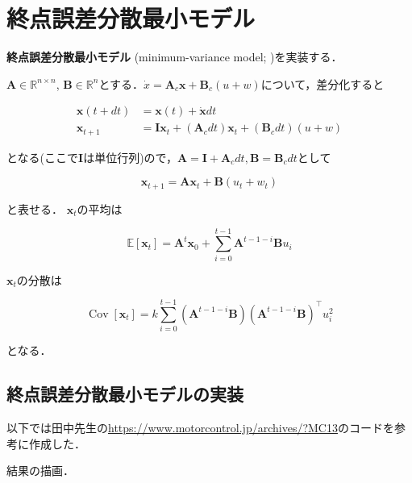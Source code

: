 \section{終点誤差分散最小モデル}
\textbf{終点誤差分散最小モデル} (minimum-variance model; \cite{Harris1998-gj})を実装する．

$\mathbf{A}\in \mathbb{R}^{n\times n}$, $\mathbf{B}\in \mathbb{R}^{n}$とする．$\dot{x}=\mathbf{A}_{c}\mathbf{x}+\mathbf{B}_{c}(u + w)$について，差分化すると


\begin{align}
\mathbf{x}(t+dt)&=\mathbf{x}(t)+\dot{\mathbf{x}}dt\\
\mathbf{x}_{t+1}&=\mathbf{I}\mathbf{x}_t+(\mathbf{A}_{c}dt)\mathbf{x}_t+(\mathbf{B}_{c}dt)(u + w)
\end{align}


となる(ここで$\mathbf{I}$は単位行列)ので，$\mathbf{A}=\mathbf{I}+\mathbf{A}_{c}dt, \mathbf{B}=\mathbf{B}_cdt$として


\begin{equation}
\mathbf{x}_{t+1} = \mathbf{A} \mathbf{x}_t + \mathbf{B}(u_t + w_t)
\end{equation}


と表せる． $\mathbf{x}_t$の平均は


\begin{equation}
\mathbb{E}\left[\mathbf{x}_{t}\right]=\mathbf{A}^{t} \mathbf{x}_{0}+\sum_{i=0}^{t-1} \mathbf{A}^{t-1-i} \mathbf{B} u_{i}
\end{equation}


$\mathbf{x}_t$の分散は


\begin{equation}
\operatorname{Cov}\left[\mathbf{x}_{t}\right]=k \sum_{i=0}^{t-1}\left(\mathbf{A}^{t-1-i} \mathbf{B}\right)\left(\mathbf{A}^{t-1-i} \mathbf{B}\right)^{\top} u_{i}^{2}
\end{equation}


となる．
\subsection{終点誤差分散最小モデルの実装}
以下では田中先生の\url{https://www.motorcontrol.jp/archives/?MC13}のコードを参考に作成した．





結果の描画．


